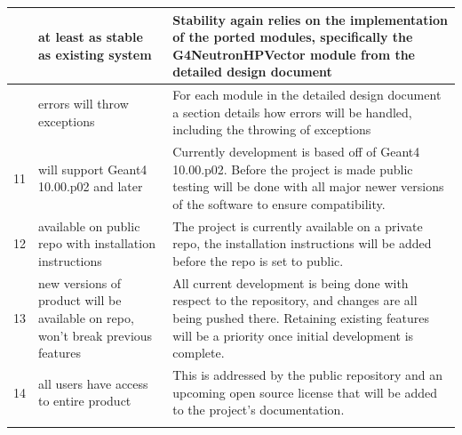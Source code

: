 \documentclass[12pt]{article}
\begin{document}
\begin{center}
\begin{longtable}{>{\raggedright\arraybackslash}p{}>{\raggedright\arraybackslash}p{}>{\raggedright\arraybackslash}p{}}
9 & at least as stable as existing system & Stability again relies on the implementation of the ported modules, specifically the G4NeutronHPVector module from the detailed design document\\\hline

10 & errors will throw exceptions & For each module in the detailed design document a section details how errors will be handled, including the throwing of exceptions\\\hline

11 & will support Geant4 10.00.p02 and later & Currently development is based off of Geant4 10.00.p02. Before the project is made public testing will be done with all major newer versions of the software to ensure compatibility.\\\hline

12 & available on public repo with installation instructions & The project is currently available on a private repo, the installation instructions will be added before the repo is set to public.\\\hline

13 & new versions of product will be available on repo, won't break previous features & All current development is being done with respect to the repository, and changes are all being pushed there. Retaining existing features will be a priority once initial development is complete.\\\hline

14 & all users have access to entire product & This is addressed by the public repository and an upcoming open source license that will be added to the project's documentation.\\

\arrayrulecolor{black}
\bottomrule
\end{longtable}
\end{center}
\end{document}

